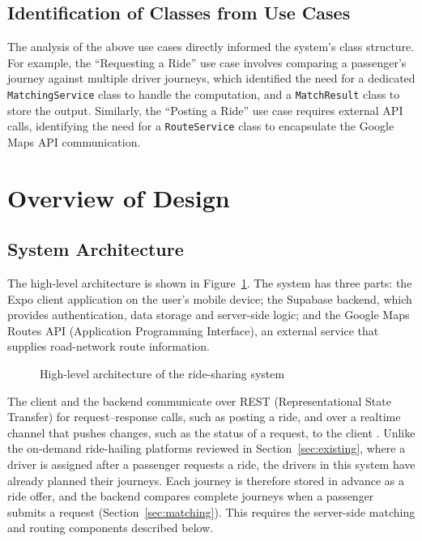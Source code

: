 \subsection{Identification of Classes from Use Cases}
 
The analysis of the above use cases directly informed the system's class structure. For example, the ``Requesting a Ride'' use case involves comparing a passenger's journey against multiple driver journeys, which identified the need for a dedicated \texttt{MatchingService} class to handle the computation, and a \texttt{MatchResult} class to store the output. Similarly, the ``Posting a Ride'' use case requires external API calls, identifying the need for a \texttt{RouteService} class to encapsulate the Google Maps API communication.
	
\section{Overview of Design}

\subsection{System Architecture}

The high-level architecture is shown in Figure~\ref{fig:architecture}. The system has three parts: the Expo client application on the user's mobile device; the Supabase backend, which provides authentication, data storage and server-side logic; and the Google Maps Routes API (Application Programming Interface), an external service that supplies road-network route information.

\begin{figure}[htbp]
  \centering
  \caption{High-level architecture of the ride-sharing system}
  \label{fig:architecture}
\end{figure}

The client and the backend communicate over REST (Representational State Transfer) for request--response calls, such as posting a ride, and over a realtime channel that pushes changes, such as the status of a request, to the client \citep{supabase2026}. Unlike the on-demand ride-hailing platforms reviewed in Section~\ref{sec:existing}, where a driver is assigned after a passenger requests a ride, the drivers in this system have already planned their journeys. Each journey is therefore stored in advance as a ride offer, and the backend compares complete journeys when a passenger submits a request (Section~\ref{sec:matching}). This requires the server-side matching and routing components described below.

